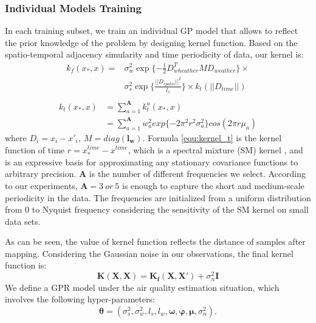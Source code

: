 \documentclass[twoside,leqno,twocolumn]{article}
\begin{document}
 \subsubsection{Individual Models Training}
In each training subset, we train an individual GP model that allows to reflect the prior knowledge of the problem by designing kernel function.
Based on the spatio-temporal adjacency simularity and time periodicity of data, our kernel is:
\begin{equation}
\begin{split}
\label{equ:kernelF}
k_f(x_*, x) = &\sigma_{w}^{2}\exp\{-\frac{1}{2}D^T_{wheather}MD_{weather}\}\times\\
	&\sigma_{s}^{2}\exp\{\frac{||D_{spatio}||^2}{l_s}\} \times k_{t}(||D_{time}||)\\
\end{split}	
\end{equation}
\begin{equation}
\begin{split}
\label{equ:kernel_t}
k_{t}(x_*, x) &= \sum_{a=1}^{\bm{A}} k_t^a(x_*, x) \\
&=\sum_{a=1}^{\bm{A}} w_a^2 exp\{-2 \pi^2 r^2 \sigma_a^2\}cos(2\pi r \mu_a)
\end{split}
\end{equation}
where $D_i = x_i - x'_i, ~ M=diag(\bm{l_w})$. Formula \ref{equ:kernel_t} is the kernel function of time $r = x_*^{time}-x^{time}$, which is a spectral mixture (SM) kernel \cite{Wilson2013Gaussian},
and is an expressive basis for approximating any stationary covariance functions to arbitrary precision. $\bm{A}$ is the number of different frequencies we select. According to our experiments, $\bm{A} = 3~or~ 5$ is enough to capture the short and medium-scale periodicity in the data. The frequencies are initialized from a uniform distribution from 0 to Nyquist frequency considering the sensitivity of the SM kernel on small data sets.

As can be seen, the value of kernel function reflects the distance of samples after mapping. Considering the Gaussian noise in our observations, the final kernel function is:
\begin{equation}
\bm{K}(\bm{X},\bm{X})=\bm{K_f}(\bm{X},\bm{X'})+\sigma_n^2\bm{I}
\end{equation}
We define a GPR model under the air quality estimation situation, which involves the following hyper-parameters:
\[
\bm{\theta}=(\sigma_s^2, \sigma_w^2, l_s, l_w, \bm{\omega}, \bm{\varphi}, \bm{\mu}, \sigma_n^2).
\]
\end{document}
